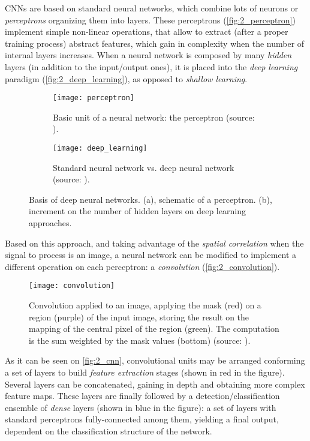 CNNs are based on standard neural networks, which combine lots of neurons or \textit{perceptrons} organizing them into layers. These perceptrons (\autoref{fig:2_perceptron}) implement simple non-linear operations, that allow to extract (after a proper training process) abstract features, which gain in complexity when the number of internal layers increases. When a neural network is composed by many \textit{hidden} layers (in addition to the input/output ones), it is placed into the \textit{deep learning} paradigm (\autoref{fig:2_deep_learning}), as opposed to \textit{shallow learning}.

\begin{figure}[h]
	\centering
	\begin{subfigure}[t]{0.35\linewidth}
		\centering
		\texttt{[image: perceptron]}
		\caption{Basic unit of a neural network: the perceptron (source: \cite{tfg}).}
		\label{fig:2_perceptron}
	\end{subfigure}
	\begin{subfigure}[t]{0.5\linewidth}
		\centering
		\texttt{[image: deep\_learning]}
		\caption{Standard neural network vs. deep neural network (source: \cite{tfg}).}
		\label{fig:2_deep_learning}
	\end{subfigure}
	\caption{Basis of deep neural networks. (a), schematic of a perceptron. (b), increment on the number of hidden layers on deep learning approaches.}
	\label{fig:2_dnns}
\end{figure}


Based on this approach, and taking advantage of the \textit{spatial correlation} when the signal to process is an image, a neural network can be modified to implement a different operation on each perceptron: a \textit{convolution} (\autoref{fig:2_convolution}).

\begin{figure}[h]
	\centering
	\texttt{[image: convolution]}
	\caption{Convolution applied to an image, applying the mask (red) on a region  (purple) of the input image, storing the result on the mapping of the central pixel of the region (green). The computation is the sum weighted by the mask values (bottom) (source: \cite{tfg}).}
	\label{fig:2_convolution}
\end{figure}

As it can be seen on \autoref{fig:2_cnn}, convolutional units may be arranged conforming a set of layers to build \textit{feature extraction} stages (shown in red in the figure). Several layers can be concatenated, gaining in depth and obtaining more complex feature maps. These layers are finally followed by a detection/classification ensemble of \textit{dense} layers (shown in blue in the figure): a set of layers with standard perceptrons fully-connected among them, yielding a final output, dependent on the classification structure of the network.

